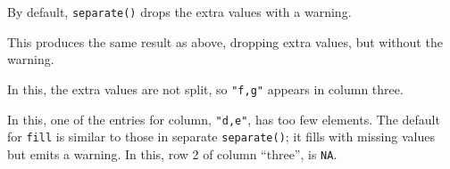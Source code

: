 \documentclass[]{book}
\newenvironment{Shaded}{\begin{snugshade}}{\end{snugshade}}
\newcommand{\CommentTok}[1]{\textcolor[rgb]{0.56,0.35,0.01}{\textit{#1}}}
\newcommand{\DataTypeTok}[1]{\textcolor[rgb]{0.13,0.29,0.53}{#1}}
\newcommand{\KeywordTok}[1]{\textcolor[rgb]{0.13,0.29,0.53}{\textbf{#1}}}
\newcommand{\NormalTok}[1]{#1}
\newcommand{\OperatorTok}[1]{\textcolor[rgb]{0.81,0.36,0.00}{\textbf{#1}}}
\newcommand{\StringTok}[1]{\textcolor[rgb]{0.31,0.60,0.02}{#1}}
\theoremstyle{plain}
\theoremstyle{remark}
\begin{document}
By default, \texttt{separate()} drops the extra values with a warning.

\begin{Shaded}
\end{Shaded}

This produces the same result as above, dropping extra values, but
without the warning.

\begin{Shaded}
\end{Shaded}

In this, the extra values are not split, so \texttt{"f,g"} appears in
column three.

In this, one of the entries for column, \texttt{"d,e"}, has too few
elements. The default for \texttt{fill} is similar to those in separate
\texttt{separate()}; it fills with missing values but emits a warning.
In this, row 2 of column ``three'', is \texttt{NA}.
\end{document}
